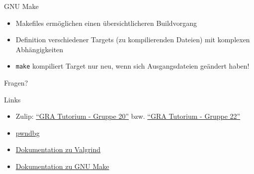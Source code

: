 \documentclass[
  german,            %
  aspectratio=169,    %
]{tumbeamer}
\begin{document}
\begin{frame}[c, fragile]{GNU Make}{}
  \begin{itemize}
    \item Makefiles ermöglichen einen übersichtlicheren Buildvorgang
    \item Definition verschiedener Targets (zu kompilierenden Dateien) mit komplexen Abhängigkeiten
    \item \verb|make| kompiliert Target nur neu, wenn sich Ausgangsdateien geändert haben!
  \end{itemize}
\end{frame}

\begin{frame}[c]{}{}
  \begin{center}
    \LARGE Fragen?
  \end{center}
\end{frame}

\begin{frame}[fragile, c]{Links}{}
  \begin{itemize}
    \item Zulip: \href{https://zulip.in.tum.de/#narrow/stream/2267-GRA-Tutorium---Gruppe-20}{\enquote{GRA Tutorium - Gruppe 20}}
          bzw. \href{https://zulip.in.tum.de/#narrow/stream/2269-GRA-Tutorium---Gruppe-22}{\enquote{GRA Tutorium - Gruppe 22}}
    \item \href{https://github.com/pwndbg/pwndbg}{pwndbg}
    \item \href{https://valgrind.org/docs/manual/manual.html}{Dokumentation zu Valgrind}
    \item \href{https://www.gnu.org/software/make/manual/html_node/index.html}{Dokumentation zu GNU Make}
  \end{itemize}
\end{frame}

\maketitle
\end{document}
